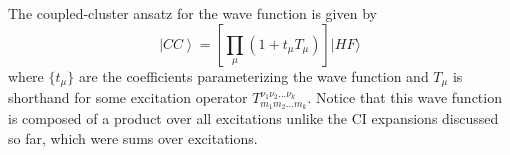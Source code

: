 \documentclass[11pt,oneside,final]{huthesis}%
\begin{document}




The coupled-cluster ansatz for the wave function is given by
\begin{equation}\label{GrindEQ__3_}
\left|CC\right\rangle =\left[\prod_{\mu }{( 1+t_{\mu }T_\mu)}\right]|HF\rangle
\end{equation}
where $\{t_\mu\}$ are the coefficients parameterizing the wave function and  $T_\mu$ is shorthand for some excitation operator $T_{m_{1} m_{2} ...m_{k} }^{\nu _{1} \nu_{2} ...\nu_{k}}$.  Notice that this wave function is composed of a product over all excitations unlike the CI expansions discussed so far, which were sums over excitations.

\end{document}
